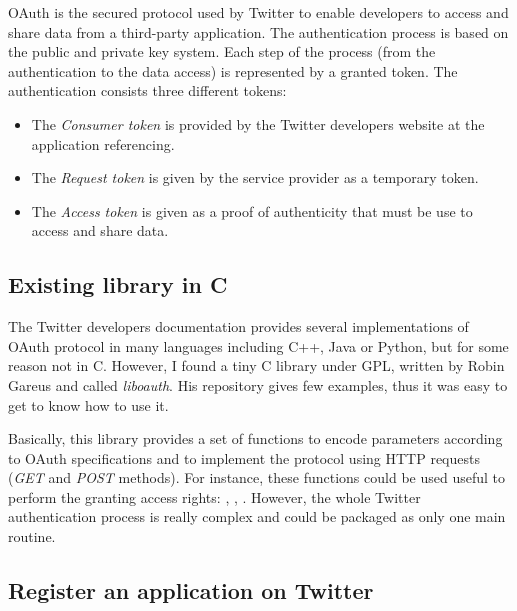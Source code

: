 \clearpage

OAuth is the secured protocol used by Twitter to enable developers to access and share data from a third-party application. The authentication process is based on the public and private key system. Each step of the process (from the authentication to the data access) is represented by a granted token. The authentication consists three different tokens:
\begin{itemize}
\item The \textit{Consumer token} is provided by the Twitter developers website at the application referencing.
\item The \textit{Request token} is given by the service provider as a temporary token.
\item The \textit{Access token} is given as a proof of authenticity that must be use to access and share data.
\end{itemize}


\subsection{Existing library in C}


\hspace{15mm}The Twitter developers documentation provides several implementations of OAuth protocol in many languages including C++, Java or Python, but for some reason not in C. However, I found a tiny C library under GPL, written by Robin Gareus and called \textit{liboauth}. His repository gives few examples, thus it was easy to get to know how to use it.

Basically, this library provides a set of functions to encode parameters according to OAuth specifications and to implement the protocol using HTTP requests (\textit{GET} and \textit{POST} methods). For instance, these functions could be used useful to perform the granting access rights: , , . However, the whole Twitter authentication process is really complex and could be packaged as only one main routine.


\subsection{Register an application on Twitter}

